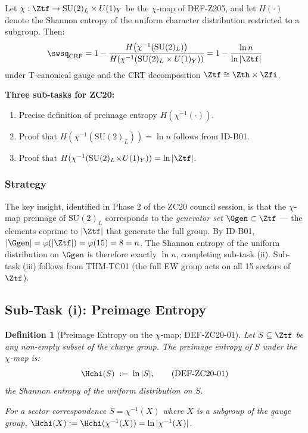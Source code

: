 \documentclass[12pt, a4paper]{article}
\newtheorem{definition}{Definition}[section]
\begin{document}
\begin{openqbox}[title={CONJ-ZC19-01 (Inherited --- to be closed here)}]
Let $\chi: \Ztf \to \mathrm{SU}(2)_L\times U(1)_Y$ be the $\chi$-map
of DEF-Z205, and let $H(\cdot)$ denote the Shannon entropy of the
uniform character distribution restricted to a subgroup.
Then:
\[
  \swsq_{\rm CRF}
  = 1 - \frac{H\!\left(\chi^{-1}(\mathrm{SU}(2)_L)\right)}
              {H\!\left(\chi^{-1}(\mathrm{SU}(2)_L\times U(1)_Y)
              \right)}
  = 1 - \frac{\ln n}{\ln|\Ztf|}
\]
under T-canonical gauge and the CRT decomposition
$\Ztf \cong \Zth\times\Zfi$.

\textbf{Three sub-tasks for ZC20:}
\begin{enumerate}[leftmargin=*, label=(\roman*), noitemsep]
  \item Precise definition of preimage entropy $H(\chi^{-1}(\cdot))$.
  \item Proof that $H(\chi^{-1}(\mathrm{SU}(2)_L)) = \ln n$
    follows from ID-B01.
  \item Proof that
    $H(\chi^{-1}(\mathrm{SU}(2)_L\!\times\!U(1)_Y)) = \ln|\Ztf|$.
\end{enumerate}
\end{openqbox}

\subsubsection{Strategy}

The key insight, identified in Phase 2 of the ZC20 council session,
is that the $\chi$-map preimage of $\mathrm{SU}(2)_L$ corresponds
to the \emph{generator set} $\Ggen \subset \Ztf$ --- the elements
coprime to $|\Ztf|$ that generate the full group.
By ID-B01, $|\Ggen| = \varphi(|\Ztf|) = \varphi(15) = 8 = n$.
The Shannon entropy of the uniform distribution on $\Ggen$
is therefore exactly $\ln n$, completing sub-task (ii).
Sub-task (iii) follows from THM-TC01 (the full EW group acts on
all 15 sectors of $\Ztf$).

\subsection{Sub-Task (i): Preimage Entropy}
\label{zc20:sec:preimage}

\begin{definition}[Preimage Entropy on the $\chi$-map; DEF-ZC20-01]
\label{zc20:def:preimage-entropy}
Let $S \subseteq \Ztf$ be any non-empty subset of the charge group.
The \emph{preimage entropy} of $S$ under the $\chi$-map is:
\begin{equation}
  \Hchi(S) \;:=\; \ln|S|,
  \tag{DEF-ZC20-01}
\end{equation}
the Shannon entropy of the uniform distribution on $S$.

For a sector correspondence $S = \chi^{-1}(X)$ where $X$ is a
subgroup of the gauge group, $\Hchi(X) := \Hchi(\chi^{-1}(X))
= \ln|\chi^{-1}(X)|$.
\end{definition}
\end{document}
